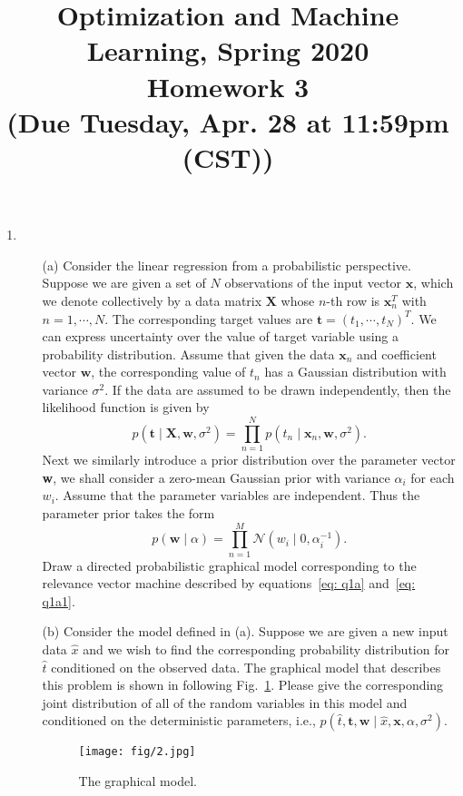 \documentclass[10pt]{article}
\begin{document}
\date{}
\title{Optimization and Machine Learning, Spring 2020 \\
Homework 3\\
\small (Due Tuesday, Apr. 28 at 11:59pm (CST))}
\maketitle
\begin{enumerate}[1.]
	
		\item
		\begin{itemize}
			\item[(a)] Consider the linear regression from a probabilistic perspective. Suppose we are given a set of $N$ observations of the input vector $ \textbf{x} $, which we denote collectively by a data matrix $ \textbf{X} $ whose $n$-th row is $ \textbf{x}^T_n $ with $ n = 1, \cdots, N $. The corresponding target values are $ \bm{t} = (t_1, \cdots, t_N)^T $. We can express uncertainty over the value of target variable using a probability distribution. Assume that given the data  $ \textbf{x}_n $ and  coefficient vector $ \textbf{w} $, the corresponding value of $ t_n $ has a Gaussian distribution with variance $ \sigma^2 $. If the data are assumed to be drawn
			independently, then the likelihood function is given by
			\begin{equation}\label{eq: q1a}
			p(\textbf{t}\mid \textbf{X}, \textbf{w}, \sigma^2) = \prod_{n = 1}^{N} p(t_n \mid \textbf{x}_n, \textbf{w}, \sigma^2).
			\end{equation}
			Next we similarly introduce a prior distribution over the parameter vector \textbf{w}, we shall consider a zero-mean Gaussian prior with variance $ \alpha_i $ for each $ w_i $. Assume that the parameter variables are independent. Thus the parameter prior takes the form
			\begin{equation}\label{eq: q1a1}
			p(\textbf{w}\mid \alpha) = \prod_{n = 1}^{M}\mathcal{N} (w_i\mid 0, \alpha_i^{-1}).
			\end{equation}
			Draw a directed probabilistic graphical model corresponding to the relevance vector machine described by equations~\eqref{eq: q1a} and~\eqref{eq: q1a1}.~
			
			\item[(b)] Consider the model defined in (a). Suppose we are given a new input data $ \hat x $ and we wish to find the corresponding probability distribution for $ \hat t $ conditioned on the observed data.
			The graphical model that describes this problem is shown in following Fig.~\ref{fig1}. Please give the corresponding joint distribution of all	of the random variables in this model and conditioned on the deterministic parameters, i.e., $ p(\hat t, \textbf{t}, \textbf{w} \mid \hat x, \textbf{x}, \alpha, \sigma^2) $.~
			\begin{figure}[h!] 
				\centering
				\texttt{[image: fig/2.jpg]}
				\caption{The graphical model.}
				\label{fig1}
			\end{figure}
		\end{itemize} 
	

\end{enumerate}
\end{document}
